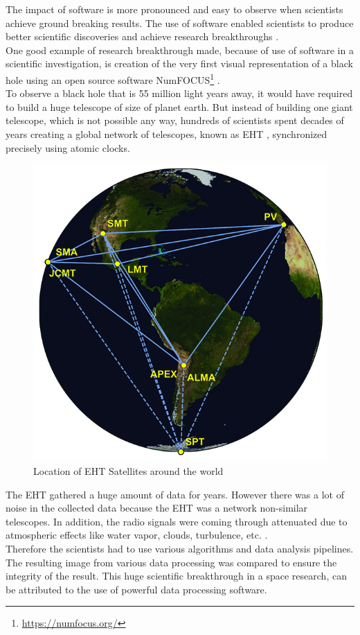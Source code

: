 The impact of software is more pronounced and easy to observe when scientists achieve ground breaking results. The use of software enabled scientists to produce better scientific discoveries and achieve research breakthroughs \citep{goble2014better}. \\

One good example of research breakthrough made, because of use of software in a scientific investigation,  is creation of the very first visual representation of a black hole using an open source software  NumFOCUS\footnote{\url{https://numfocus.org/}} \citep{event2019first}. \\

To observe a black hole that is 55 million light years away, it would have required to build a huge telescope of size of planet earth. But instead of building one giant telescope, which is not possible any way, hundreds of scientists spent decades of years creating a global network of telescopes, known as  \ac{EHT} \citep{enwiki:1052167868}, synchronized precisely using atomic clocks. \\

\begin{figure}[htbp]
	\centering
	\includegraphics[width=.45\textwidth]{4.graphics/figures/ch_2/EHT}
	\caption{Location of \ac{EHT} Satellites around the world}
	\label{fig:chapter03:setup}
\end{figure}

The EHT gathered a huge amount of data for years. However there was a lot of noise in the collected data because the EHT was a network  non-similar telescopes. In addition, the radio signals were coming through attenuated due to atmospheric effects like water vapor, clouds, turbulence, etc. \citep{NumFOCUSblackhole}.\\

Therefore the scientists had to use various algorithms and data analysis pipelines. The resulting image from various data processing was compared to ensure the integrity of the result. This huge scientific breakthrough in a space research, can be attributed to the use of powerful data processing software. 






